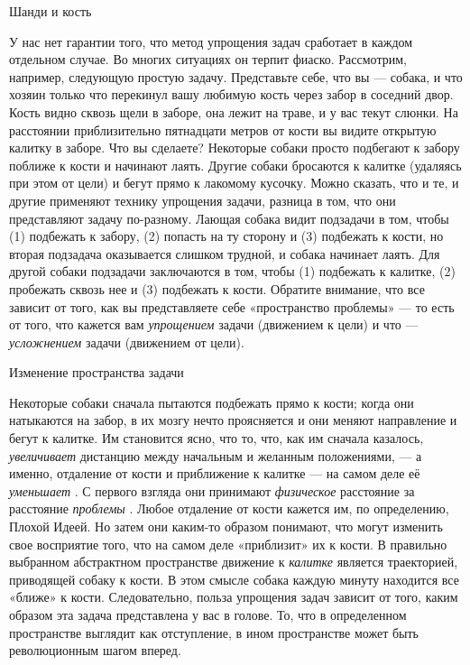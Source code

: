 \documentclass[../main.tex]{subfiles}
\begin{document}
Шанди и кость

У нас нет гарантии того, что метод упрощения задач сработает в каждом отдельном случае. Во многих ситуациях он терпит фиаско. Рассмотрим, например, следующую простую задачу. Представьте себе, что вы --- собака, и что хозяин только что перекинул вашу любимую кость через забор в соседний двор. Кость видно сквозь щели в заборе, она лежит на траве, и у вас текут слюнки. На расстоянии приблизительно пятнадцати метров от кости вы видите открытую калитку в заборе. Что вы сделаете? Некоторые собаки просто подбегают к забору поближе к кости и начинают лаять. Другие собаки бросаются к калитке (удаляясь при этом от цели) и бегут прямо к лакомому кусочку. Можно сказать, что и те, и другие применяют технику упрощения задачи, разница в том, что они представляют задачу по-разному. Лающая собака видит подзадачи в том, чтобы (1) подбежать к забору, (2) попасть на ту сторону и (3) подбежать к кости, но вторая подзадача оказывается слишком трудной, и собака начинает лаять. Для другой собаки подзадачи заключаются в том, чтобы (1) подбежать к калитке, (2) пробежать сквозь нее и (3) подбежать к кости. Обратите внимание, что все зависит от того, как вы представляете себе «пространство проблемы» --- то есть от того, что кажется вам \emph{упрощением} задачи (движением к цели) и что --- \emph{усложнением} задачи (движением от цели).

Изменение пространства задачи

Некоторые собаки сначала пытаются подбежать прямо к кости; когда они натыкаются на забор, в их мозгу нечто проясняется и они меняют направление и бегут к калитке. Им становится ясно, что то, что, как им сначала казалось, \emph{увеличивает} дистанцию между начальным и желанным положениями, --- а именно, отдаление от кости и приближение к калитке --- на самом деле её \emph{уменьшает} . С первого взгляда они принимают \emph{физическое} расстояние за расстояние \emph{проблемы} . Любое отдаление от кости кажется им, по определению, Плохой Идеей. Но затем они каким-то образом понимают, что могут изменить свое восприятие того, что на самом деле «приблизит» их к кости. В правильно выбранном абстрактном пространстве движение к \emph{калитке} является траекторией, приводящей собаку к кости. В этом смысле собака каждую минуту находится все «ближе» к кости. Следовательно, польза упрощения задач зависит от того, каким образом эта задача представлена у вас в голове. То, что в определенном пространстве выглядит как отступление, в ином пространстве может быть революционным шагом вперед.
\end{document}
